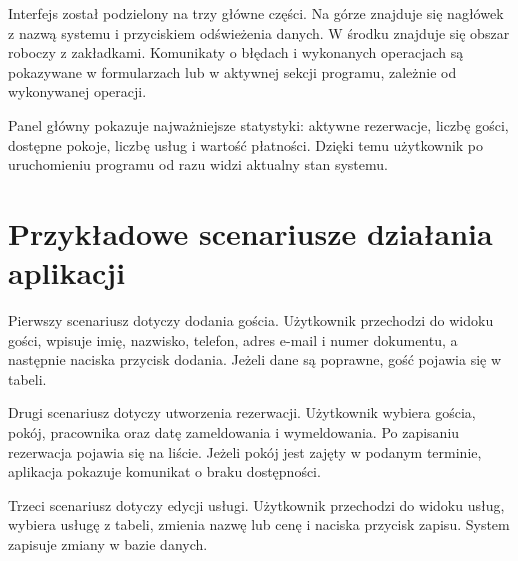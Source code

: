 Interfejs został podzielony na trzy główne części. Na górze znajduje się nagłówek z nazwą systemu i przyciskiem odświeżenia danych. W środku znajduje się obszar roboczy z zakładkami. Komunikaty o błędach i wykonanych operacjach są pokazywane w formularzach lub w aktywnej sekcji programu, zależnie od wykonywanej operacji.

Panel główny pokazuje najważniejsze statystyki: aktywne rezerwacje, liczbę gości, dostępne pokoje, liczbę usług i wartość płatności. Dzięki temu użytkownik po uruchomieniu programu od razu widzi aktualny stan systemu.

\section{Przykładowe scenariusze działania aplikacji}

Pierwszy scenariusz dotyczy dodania gościa. Użytkownik przechodzi do widoku gości, wpisuje imię, nazwisko, telefon, adres e-mail i numer dokumentu, a następnie naciska przycisk dodania. Jeżeli dane są poprawne, gość pojawia się w tabeli.

Drugi scenariusz dotyczy utworzenia rezerwacji. Użytkownik wybiera gościa, pokój, pracownika oraz datę zameldowania i wymeldowania. Po zapisaniu rezerwacja pojawia się na liście. Jeżeli pokój jest zajęty w podanym terminie, aplikacja pokazuje komunikat o braku dostępności.

Trzeci scenariusz dotyczy edycji usługi. Użytkownik przechodzi do widoku usług, wybiera usługę z tabeli, zmienia nazwę lub cenę i naciska przycisk zapisu. System zapisuje zmiany w bazie danych.
